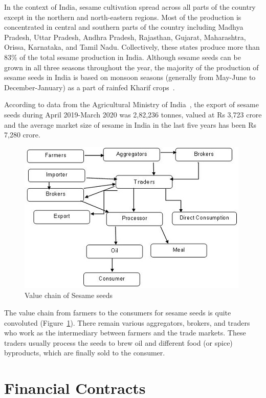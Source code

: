 \documentclass[12pt]{report}
\begin{document}
In the context of India, sesame cultivation spread across all parts of the country except in the northern and north-eastern regions. Most of the production is concentrated in central and southern parts of the country including Madhya Pradesh, Uttar Pradesh, Andhra Pradesh, Rajasthan, Gujarat, Maharashtra, Orissa, Karnataka, and Tamil Nadu. Collectively, these states produce more than $83\%$ of the total sesame production in India. Although sesame seeds can be grown in all three seasons throughout the year, the majority of the production of sesame seeds in India is based on monsoon seasons (generally from May-June to December-January) as a part of rainfed Kharif crops~\cite{ncdex}.

According to data from the Agricultural Ministry of India~\cite{agro-ministry, eco-times}, the export of sesame seeds during April 2019-March 2020 was 2,82,236 tonnes, valued at Rs 3,723 crore and the average market size of sesame in India in the last five years has been Rs 7,280 crore.


\begin{figure}[h]
    \centering
    \includegraphics[width = 0.8\linewidth]{SesameSeeds_Value_Chain.jpg}
    \caption{Value chain of Sesame seeds}
    \label{fig:sesame-vc}
\end{figure}

The value chain from farmers to the consumers for sesame seeds is quite convoluted (Figure~\ref{fig:sesame-vc}). There remain various aggregators, brokers, and traders who work as the intermediary between farmers and the trade markets. These traders usually process the seeds to brew oil and different food (or spice) byproducts, which are finally sold to the consumer.


\section{Financial Contracts}
\end{document}
